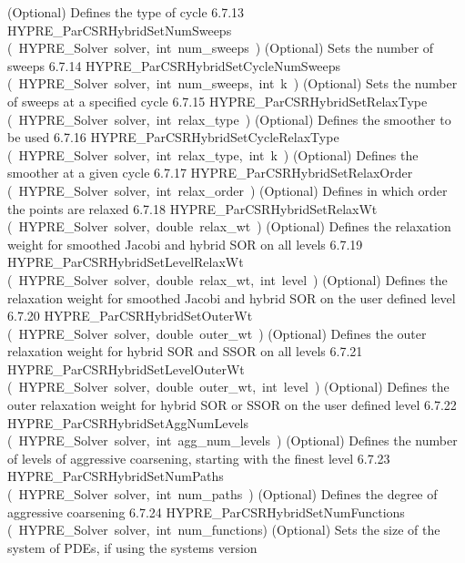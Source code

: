 \documentclass{article}
\begin{document}
\begin{cxxentry}
\begin{cxxentry}
\begin{cxxnames}
{(Optional) Defines the type of cycle}
        {6.7.13}
        {HYPRE\_ParCSRHybridSetNumSweeps}
        {(\ HYPRE\_Solver\ solver,\ int\ num\_sweeps\ )}
        {
(Optional) Sets the number of sweeps}
        {6.7.14}
        {HYPRE\_ParCSRHybridSetCycleNumSweeps}
        {(\ HYPRE\_Solver\ solver,\ int\ num\_sweeps,\ int\ k\ )}
        {
(Optional) Sets the number of sweeps at a specified cycle}
        {6.7.15}
        {HYPRE\_ParCSRHybridSetRelaxType}
        {(\ HYPRE\_Solver\ solver,\ int\ relax\_type\ )}
        {
(Optional) Defines the smoother to be used}
        {6.7.16}
        {HYPRE\_ParCSRHybridSetCycleRelaxType}
        {(\ HYPRE\_Solver\ solver,\ int\ relax\_type,\ int\ k\ )}
        {
(Optional) Defines the smoother at a given cycle}
        {6.7.17}
        {HYPRE\_ParCSRHybridSetRelaxOrder}
        {(\ HYPRE\_Solver\ solver,\ int\ relax\_order\ )}
        {
(Optional) Defines in which order the points are relaxed}
        {6.7.18}
        {HYPRE\_ParCSRHybridSetRelaxWt}
        {(\ HYPRE\_Solver\ solver,\ double\ relax\_wt\ )}
        {
(Optional) Defines the relaxation weight for smoothed Jacobi and hybrid SOR
on all levels}
        {6.7.19}
        {HYPRE\_ParCSRHybridSetLevelRelaxWt}
        {(\ HYPRE\_Solver\ solver,\ double\ relax\_wt,\ int\ level\ )}
        {
(Optional) Defines the relaxation weight for smoothed Jacobi and hybrid SOR
on the user defined level}
        {6.7.20}
        {HYPRE\_ParCSRHybridSetOuterWt}
        {(\ HYPRE\_Solver\ solver,\ double\ outer\_wt\ )}
        {
(Optional) Defines the outer relaxation weight for hybrid SOR and SSOR
on all levels}
        {6.7.21}
        {HYPRE\_ParCSRHybridSetLevelOuterWt}
        {(\ HYPRE\_Solver\ solver,\ double\ outer\_wt,\ int\ level\ )}
        {
(Optional) Defines the outer relaxation weight for hybrid SOR or SSOR
on the user defined level}
        {6.7.22}
        {HYPRE\_ParCSRHybridSetAggNumLevels}
        {(\ HYPRE\_Solver\ solver,\ int\ agg\_num\_levels\ )}
        {
(Optional) Defines the number of levels of aggressive coarsening,
starting with the finest level}
        {6.7.23}
        {HYPRE\_ParCSRHybridSetNumPaths}
        {(\ HYPRE\_Solver\ solver,\ int\ num\_paths\ )}
        {
(Optional) Defines the degree of aggressive coarsening}
        {6.7.24}
        {HYPRE\_ParCSRHybridSetNumFunctions}
        {(\ HYPRE\_Solver\ solver,\ int\ num\_functions)}
        {
(Optional) Sets the size of the system of PDEs, if using the systems version}

\end{cxxnames}
\end{cxxentry}
\end{cxxentry}
\end{document}
